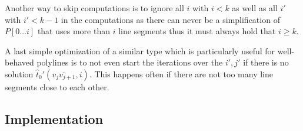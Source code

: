 Another way to skip computations is to ignore all \(i\) with \(i < k\) as well as all \(i'\) with \(i' < k - 1\) in the computations as there can never be a simplification of \(P[0\dots i]\) that uses more than \(i\) line segments thus it must always hold that \(i \geq k\). 

A last simple optimization of a similar type which is particularly useful for well-behaved polylines is to not even start the iterations over the \(i', j'\) if there is no solution \(\hat t_0'(\overline{v_{j}v_{j+1}}, i)\). This happens often if there are not too many line segments close to each other.












\subsection{Implementation}
\label{subsec:implementation}
%
%


